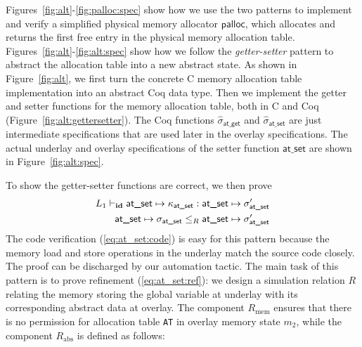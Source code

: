 Figures~\ref{fig:alt}-\ref{fig:palloc:spec} show how we use the two
patterns to implement and verify a simplified physical memory
allocator $\textsf{palloc}$, which allocates and returns the
first free entry in the physical memory allocation table.
Figures~\ref{fig:alt}-\ref{fig:alt:spec} show how we follow
the {\it getter-setter} pattern
to abstract the allocation table into a new abstract state.
As shown in Figure~\ref{fig:alt}, we first turn the concrete C
memory allocation table implementation into an abstract Coq data
type. Then we implement the getter and setter functions for the
memory allocation table, both in C and Coq (\cf Figure~\ref{fig:alt:gettersetter}). 
The Coq functions $\hat{\sigma}_\textsf{at\_get}$ and $\hat{\sigma}_\textsf{at\_set}$
are just intermediate specifications that are used
later in the overlay specifications.
The actual underlay and overlay specifications of the setter
function $\textsf{at\_set}$ are shown in Figure~\ref{fig:alt:spec}.

To show the getter-setter functions are correct, we then prove\begin{align}
L_1 \vdash_{\textbf{id}} \textsf{at\_set} \mapsto \kappa_\textsf{at\_set} : \textsf{at\_set} \mapsto \sigma'_\textsf{at\_set}
\label{eq:at_set:code}
\\
\textsf{at\_set} \mapsto \sigma_\textsf{at\_set}\le_{R}\textsf{at\_set} \mapsto \sigma'_\textsf{at\_set}
\label{eq:at_set:ref}
\end{align}
The code verification (\ref{eq:at_set:code}) is easy for this pattern
because the memory load and store operations in the underlay
match the source code closely.
The proof can be discharged by our automation tactic.
The main task of this pattern is to prove refinement (\ref{eq:at_set:ref}):
we design a simulation relation $R$
relating the memory storing the global variable at underlay
with its corresponding abstract data at overlay.
The component $R_\text{mem}$ ensures that there is no permission
for allocation table \verb"AT" in overlay memory state $m_2$, 
while the component $R_\text{abs}$ is defined as follows:

